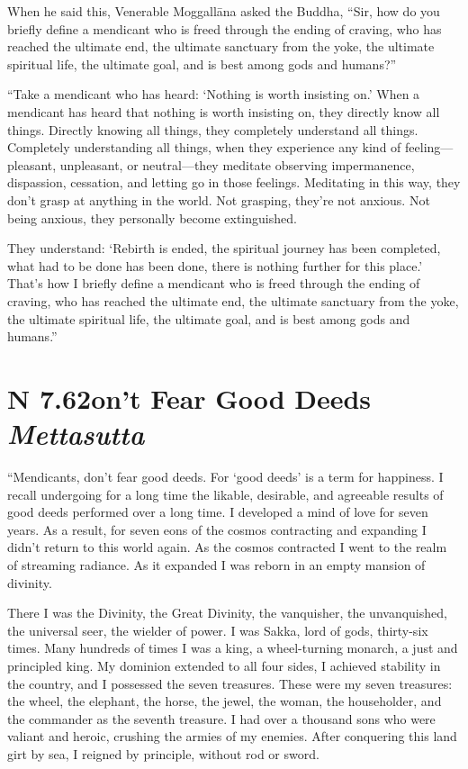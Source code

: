 \documentclass[12pt,openany]{book}%
\newcommand*{\suttatitleacronym}[1]{\smaller[2]{#1}\vspace*{.3em}}
\newcommand*{\suttatitletranslation}[1]{\linebreak{#1}}
\newcommand*{\suttatitleroot}[1]{\linebreak\smaller[2]\itshape{#1}}
\newcommand*{\tocacronym}[1]{\hspace*{-3.3em}{#1}\quad}
\newcommand*{\toctranslation}[1]{#1}
\newcommand*{\tocroot}[1]{(\textit{#1})}
\begin{document}
When he said this, Venerable \textsanskrit{Moggallāna} asked the Buddha, “Sir, how do you briefly define a mendicant who is freed through the ending of craving, who has reached the ultimate end, the ultimate sanctuary from the yoke, the ultimate spiritual life, the ultimate goal, and is best among gods and humans?” 

“Take a mendicant who has heard: ‘Nothing is worth insisting on.’ When a mendicant has heard that nothing is worth insisting on, they directly know all things. Directly knowing all things, they completely understand all things. Completely understanding all things, when they experience any kind of feeling—pleasant, unpleasant, or neutral—they meditate observing impermanence, dispassion, cessation, and letting go in those feelings. Meditating in this way, they don’t grasp at anything in the world. Not grasping, they’re not anxious. Not being anxious, they personally become extinguished. 

They understand: ‘Rebirth is ended, the spiritual journey has been completed, what had to be done has been done, there is nothing further for this place.’ That’s how I briefly define a mendicant who is freed through the ending of craving, who has reached the ultimate end, the ultimate sanctuary from the yoke, the ultimate spiritual life, the ultimate goal, and is best among gods and humans.” 

%
\section*{{\suttatitleacronym AN 7.62}{\suttatitletranslation Don’t Fear Good Deeds }{\suttatitleroot Mettasutta}}
\addcontentsline{toc}{section}{\tocacronym{AN 7.62} \toctranslation{Don’t Fear Good Deeds } \tocroot{Mettasutta}}

“Mendicants, don’t fear good deeds. For ‘good deeds’ is a term for happiness. I recall undergoing for a long time the likable, desirable, and agreeable results of good deeds performed over a long time. I developed a mind of love for seven years. As a result, for seven eons of the cosmos contracting and expanding I didn’t return to this world again. As the cosmos contracted I went to the realm of streaming radiance. As it expanded I was reborn in an empty mansion of divinity. 

There I was the Divinity, the Great Divinity, the vanquisher, the unvanquished, the universal seer, the wielder of power. I was Sakka, lord of gods, thirty-six times. Many hundreds of times I was a king, a wheel-turning monarch, a just and principled king. My dominion extended to all four sides, I achieved stability in the country, and I possessed the seven treasures. These were my seven treasures: the wheel, the elephant, the horse, the jewel, the woman, the householder, and the commander as the seventh treasure. I had over a thousand sons who were valiant and heroic, crushing the armies of my enemies. After conquering this land girt by sea, I reigned by principle, without rod or sword. 
\end{document}
